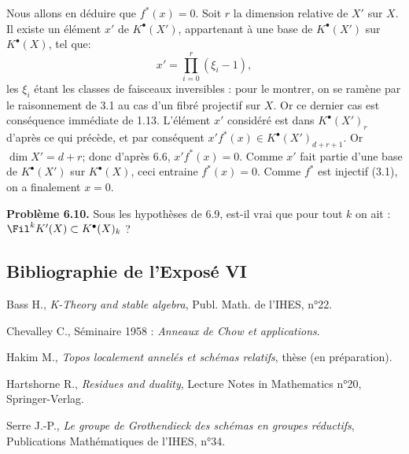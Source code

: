 Nous allons en déduire que $f^*(x)=0$. Soit $r$ la dimension relative de $X'$ sur $X$. Il existe un élément $x'$ de $K^{\bullet}(X')$, appartenant à une base de $K^{\bullet}(X')$ sur $K^{\bullet}(X)$, tel que:
\[
  x'=\prod_{i=0}^{r}(\xi_i-1),
\]
les $\xi_i$
étant les classes de faisceaux inversibles : pour le montrer, on se ramène par le raisonnement de 3.1 au cas d'un fibré projectif sur $X$. Or ce dernier cas est conséquence immédiate de 1.13. L'élément $x'$ considéré est dans $K^{\bullet}(X')_r$ d'après ce qui précède, et par conséquent $x'f^*(x)\in K^{\bullet}(X')_{d+r+1}$. Or $\dim X'=d+r$; donc d'après 6.6, $x'f^*(x)=0$. Comme $x'$ fait partie d'une base de $K^{\bullet}(X')$ sur $K^{\bullet}(X)$, ceci entraine $f^*(x)=0$. Comme $f^*$ est injectif (3.1), on a finalement $x=0$.

\textbf{Problème 6.10.} Sous les hypothèses de 6.9, est-il vrai que pour tout $k$ on ait : $\Fil^kK'(X)\subset K^{\bullet}(X)_k$ ?

\subsection*{Bibliographie de l'Exposé VI}
\begin{enumerate}[label={\textup{[\arabic*]}}]
\item Bass H., \emph{K-Theory and stable algebra}, Publ. Math. de l'IHES, n°22.
\item Chevalley C., Séminaire 1958 : \emph{Anneaux de Chow et applications}.
\item Hakim M., \emph{Topos localement annelés et schémas relatifs}, thèse (en préparation).
\item Hartshorne R., \emph{Residues and duality}, Lecture Notes in Mathematics n°20, Springer-Verlag.
\item Serre J.-P., \emph{Le groupe de Grothendieck des schémas en groupes réductifs}, Publications Mathématiques de l'IHES, n°34.
\end{enumerate}



\providecommand{\Kosz}{\mathrm K}
\providecommand{\Proj}{\operatorname{Proj}}
\providecommand{\Sym}{\operatorname{Sym}}
\providecommand{\gr}{\operatorname{gr}}
\providecommand{\Tor}{\operatorname{Tor}}
\providecommand{\Spec}{\operatorname{Spec}}
\providecommand{\Imf}{\operatorname{Im}}
\providecommand{\Ker}{\operatorname{Ker}}
\providecommand{\Id}{\operatorname{Id}}
\providecommand{\rad}{\operatorname{rad}}
\providecommand{\cO}{\mathcal O}
\providecommand{\cS}{\mathcal S}
\providecommand{\cJ}{\mathcal J}
\providecommand{\cN}{\mathcal N}
\providecommand{\bfP}{\mathbf P}
\providecommand{\bfA}{\mathbf A}


